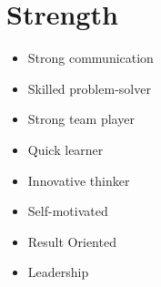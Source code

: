 \documentclass[letterpaper,11pt]{article}
\newcommand{\resumeSubHeadingListStart}{\begin{itemize}[leftmargin=0.0in, label={}]}
\newcommand{\resumeSubHeadingListEnd}{\end{itemize}}
\begin{document}
\section{Strength}
        \begin{multicols}{4}
            \begin{itemize}[itemsep=-5pt, parsep=3pt]
                \item Strong communication
                \item Skilled problem-solver
                \item Strong team player
                \item Quick learner
                \item Innovative thinker
                \item Self-motivated
                \item Result Oriented 
                \item Leadership
            \end{itemize}
        \end{multicols}
        \vspace*{2.0\multicolsep}
\end{document}
